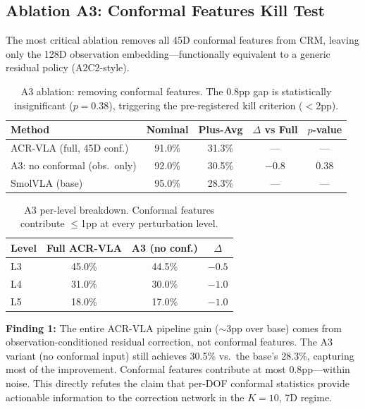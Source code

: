 \documentclass[letterpaper]{article}
\begin{document}
\subsection{Ablation A3: Conformal Features Kill Test}
\label{sec:exp-a3}

The most critical ablation removes all 45D conformal features from CRM, leaving only the 128D observation embedding---functionally equivalent to a generic residual policy (A2C2-style).

\begin{table}[h]
\centering
\caption{A3 ablation: removing conformal features. The 0.8pp gap is statistically insignificant ($p{=}0.38$), triggering the pre-registered kill criterion ($<$2pp).}
\label{tab:a3}
\begin{tabular}{lcccc}
\toprule
Method & Nominal & Plus-Avg & $\Delta$ vs Full & $p$-value \\
\midrule
ACR-VLA (full, 45D conf.) & 91.0\% & 31.3\% & --- & --- \\
A3: no conformal (obs.\ only) & 92.0\% & 30.5\% & $-0.8$ & 0.38 \\
SmolVLA (base) & 95.0\% & 28.3\% & --- & --- \\
\bottomrule
\end{tabular}
\end{table}

\begin{table}[h]
\centering
\caption{A3 per-level breakdown. Conformal features contribute $\leq$1pp at every perturbation level.}
\label{tab:a3-level}
\begin{tabular}{lccc}
\toprule
Level & Full ACR-VLA & A3 (no conf.) & $\Delta$ \\
\midrule
L3 & 45.0\% & 44.5\% & $-0.5$ \\
L4 & 31.0\% & 30.0\% & $-1.0$ \\
L5 & 18.0\% & 17.0\% & $-1.0$ \\
\bottomrule
\end{tabular}
\end{table}

\textbf{Finding 1:} The entire ACR-VLA pipeline gain ($\sim$3pp over base) comes from observation-conditioned residual correction, not conformal features. The A3 variant (no conformal input) still achieves 30.5\% vs.\ the base's 28.3\%, capturing most of the improvement. Conformal features contribute at most 0.8pp---within noise. This directly refutes the claim that per-DOF conformal statistics provide actionable information to the correction network in the $K{=}10$, 7D regime.
\end{document}
